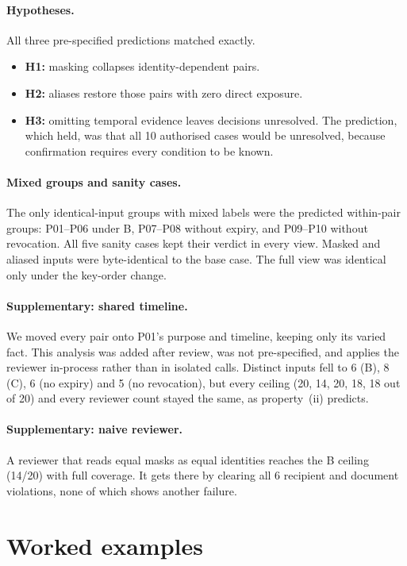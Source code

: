 \documentclass[11pt]{article}
\begin{document}
\paragraph{Hypotheses.} All three pre-specified predictions matched exactly.
\begin{itemize}
  \item \textbf{H1:} masking collapses identity-dependent pairs.
  \item \textbf{H2:} aliases restore those pairs with zero direct exposure.
  \item \textbf{H3:} omitting temporal evidence leaves decisions unresolved. The prediction, which held, was that all 10 authorised cases would be unresolved, because confirmation requires every condition to be known.
\end{itemize}

\paragraph{Mixed groups and sanity cases.} The only identical-input groups with mixed labels were the predicted within-pair groups: P01--P06 under B, P07--P08 without expiry, and P09--P10 without revocation. All five sanity cases kept their verdict in every view. Masked and aliased inputs were byte-identical to the base case. The full view was identical only under the key-order change.

\paragraph{Supplementary: shared timeline.} We moved every pair onto P01's purpose and timeline, keeping only its varied fact. This analysis was added after review, was not pre-specified, and applies the reviewer in-process rather than in isolated calls. Distinct inputs fell to 6 (B), 8 (C), 6 (no expiry) and 5 (no revocation), but every ceiling (20, 14, 20, 18, 18 out of 20) and every reviewer count stayed the same, as property~(ii) predicts.

\paragraph{Supplementary: naive reviewer.} A reviewer that reads equal masks as equal identities reaches the B ceiling (14/20) with full coverage. It gets there by clearing all 6 recipient and document violations, none of which shows another failure.

\section{Worked examples}
\end{document}
